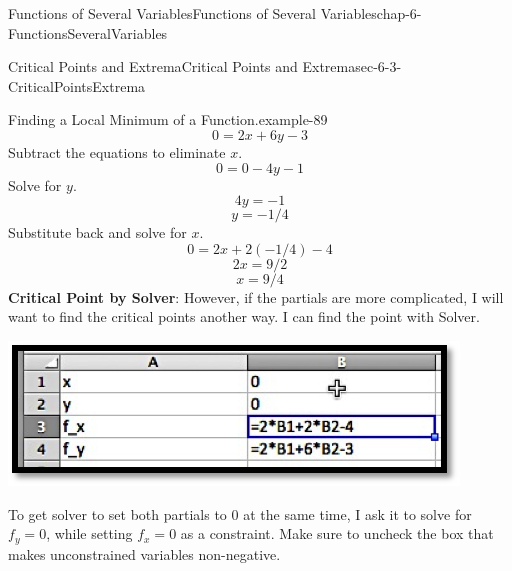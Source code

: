 \documentclass[oneside,10pt,]{book}
\newcommand{\terminology}[1]{\textbf{#1}}
\numberwithin{equation}{section}
\begin{document}
\begin{chapterptx}{Functions of Several Variables}{}{Functions of Several Variables}{}{}{chap-6-FunctionsSeveralVariables}
\begin{sectionptx}{Critical Points and Extrema}{}{Critical Points and Extrema}{}{}{sec-6-3-CriticalPointsExtrema}
\begin{example}{Finding a Local Minimum of a Function.}{example-89}
\begin{equation*}
\end{equation*}
%
\begin{equation*}
0=2x+6y-3
\end{equation*}
\hypertarget{p-2334}{}%
Subtract the equations to eliminate \(x\).%
%
\begin{equation*}
0=0-4y-1
\end{equation*}
\hypertarget{p-2335}{}%
Solve for \(y\).%
%
\begin{equation*}
4y=-1
\end{equation*}
%
\begin{equation*}
y=-1/4
\end{equation*}
\hypertarget{p-2336}{}%
Substitute back and solve for \(x\).%
%
\begin{equation*}
0=2x+2(-1/4)-4
\end{equation*}
%
\begin{equation*}
2x=9/2
\end{equation*}
%
\begin{equation*}
x=9/4
\end{equation*}
\hypertarget{p-2337}{}%
\terminology{Critical Point by Solver}: However, if the partials are more complicated, I will want to find the critical points another way.  I can find the point with Solver.%
\begin{sidebyside}{1}{0.25}{0.25}{0}%
\begin{sbspanel}{0.5}%
\includegraphics[width=1\linewidth]{images/sec-6-3-1.png}
\end{sbspanel}%
\end{sidebyside}%
\par
\hypertarget{p-2338}{}%
To get solver to set both partials to 0 at the same time, I ask it to solve for \(f_y=0\), while setting \(f_x=0\) as a constraint.  Make sure to uncheck the box that makes unconstrained variables non-negative.%
\begin{sidebyside}{1}{0.1}{0.1}{0}%
\begin{sbspanel}{0.8}%

\end{sbspanel}
\end{sidebyside}
\end{example}
\end{sectionptx}
\end{chapterptx}
\end{document}
